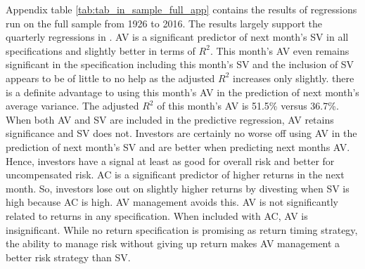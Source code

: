 Appendix table \ref{tab:tab_in_sample_full_app} contains the results of regressions run on the full sample from 1926 to 2016. The results largely support the quarterly regressions in \citet{pollet_average_2010}. AV is a significant predictor of next month’s SV in all specifications and slightly better in terms of $R^{2}$. This month’s AV even remains significant in the specification including this month’s SV and the inclusion of SV appears to be of little to no help as the adjusted $R^{2}$ increases only slightly. there is a definite advantage to using this month’s AV in the prediction of next month’s average variance. The adjusted $R^{2}$ of this month's AV is 51.5\% versus 36.7\%. When both AV and SV are included in the predictive regression, AV retains significance and SV does not. Investors are certainly no worse off using AV in the prediction of next month's SV and are better when predicting next months AV. Hence, investors have a signal at least as good for overall risk and better for uncompensated risk. AC is a significant predictor of higher returns in the next month. So, investors lose out on slightly higher returns by divesting when SV is high because AC is high. AV management avoids this. AV is not significantly related to returns in any specification. When included with AC, AV is insignificant. While no return specification is promising as return timing strategy, the ability to manage risk without giving up return makes AV management a better risk strategy than SV.
